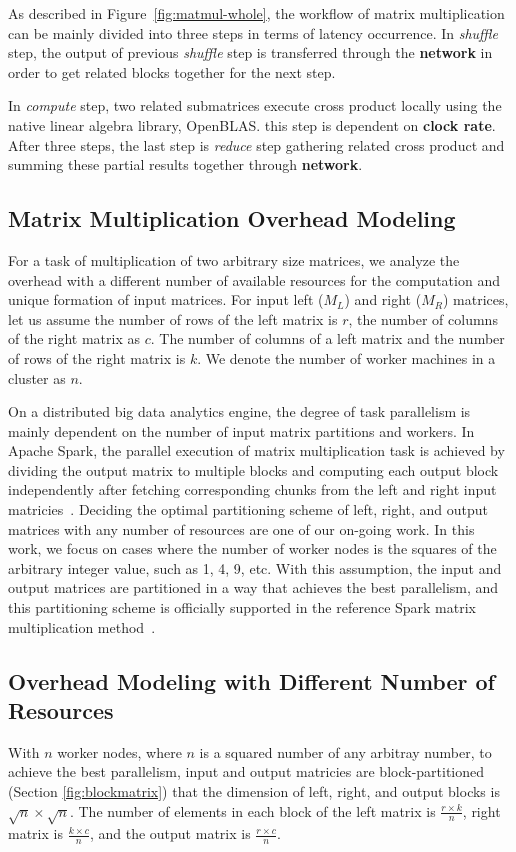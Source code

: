 \documentclass[10pt, conference, compsocconf]{IEEEtran}
\begin{document}
As described in Figure~\ref{fig:matmul-whole}, the workflow of matrix multiplication can be mainly divided into three steps in terms of latency occurrence. In \textit{shuffle} step, the output of previous \textit{shuffle} step is transferred through the \textbf{network} in order to get related blocks together for the next step.

In \textit{compute} step, two related submatrices execute cross product locally using the native linear algebra library, OpenBLAS. this step is dependent on \textbf{clock rate}. After three steps, the last step is \textit{reduce} step gathering related cross product and summing these partial results together through \textbf{network}.

\subsection{Matrix Multiplication Overhead Modeling}
For a task of multiplication of two arbitrary size matrices, we analyze the overhead with a different number of available resources for the computation and unique formation of input matrices. For input left ($M_L$) and right ($M_R$) matrices, let us assume the number of rows of the left matrix is $r$, the number of columns of the right matrix as $c$. The number of columns of a left matrix and the number of rows of the right matrix is $k$. We denote the number of worker machines in a cluster as $n$.

On a distributed big data analytics engine, the degree of task parallelism is mainly dependent on the number of input matrix partitions and workers. In Apache Spark, the parallel execution of matrix multiplication task is achieved by dividing the output matrix to multiple blocks and computing each output block independently after fetching corresponding chunks from the left and right input matricies~\cite{spark-mm}. Deciding the optimal partitioning scheme of left, right, and output matrices with any number of resources are one of our on-going work. In this work, we focus on cases where the number of worker nodes is the squares of the arbitrary integer value, such as 1, 4, 9, etc. With this assumption, the input and output matrices are partitioned in a way that achieves the best parallelism, and this partitioning scheme is officially supported in the reference Spark matrix multiplication method~\cite{spark-mm-code}.

\subsection{Overhead Modeling with Different Number of Resources}\label{sec:overhead-number-of-nodes}
With $n$ worker nodes, where $n$ is a squared number of any arbitray number, to achieve the best parallelism, input and output matricies are block-partitioned (Section \ref{fig:blockmatrix}) that the dimension of left, right, and output blocks is $\sqrt{n} \times \sqrt{n}$. The number of elements in each block of the left matrix is $\frac{r \times k}{n}$, right matrix is $\frac{k \times c}{n}$, and the output matrix is $\frac{r \times c}{n}$.
\end{document}
